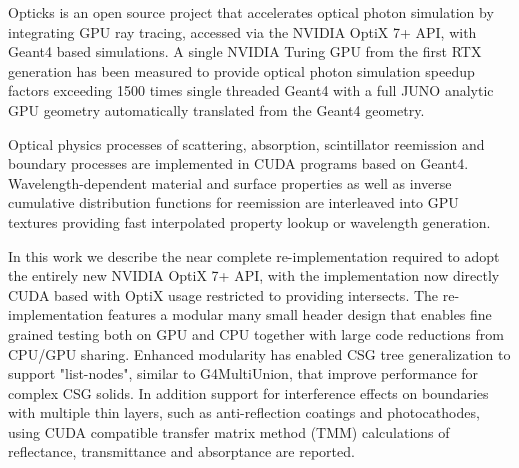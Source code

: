 Opticks is an open source project that accelerates optical photon simulation 
by integrating GPU ray tracing, accessed via the NVIDIA OptiX 7+ API, with 
Geant4 based simulations. 
A single NVIDIA Turing GPU from the first RTX generation has been measured to provide optical 
photon simulation speedup factors exceeding 1500 times single threaded Geant4 
with a full JUNO analytic GPU geometry automatically translated from the Geant4 geometry.

Optical physics processes of scattering, absorption, scintillator reemission and 
boundary processes are implemented in CUDA programs based on Geant4.
Wavelength-dependent material and surface properties as well as  
inverse cumulative distribution functions for reemission are interleaved into 
GPU textures providing fast interpolated property lookup or wavelength generation.

In this work we describe the near complete re-implementation required to adopt 
the entirely new NVIDIA OptiX 7+ API, with the implementation now directly CUDA 
based with OptiX usage restricted to providing intersects. 
The re-implementation features a modular many small header 
design that enables fine grained testing both on GPU and CPU 
together with large code reductions from CPU/GPU sharing. 
Enhanced modularity has enabled CSG tree generalization to support "list-nodes", 
similar to G4MultiUnion, that improve performance for complex CSG solids. 
In addition support for interference effects on boundaries with multiple thin layers,
such as anti-reflection coatings and photocathodes, using CUDA compatible
transfer matrix method (TMM) calculations of reflectance, transmittance and
absorptance are reported.
